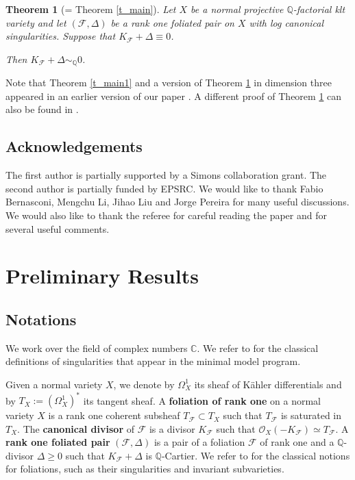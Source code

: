 \documentclass[12pt]{amsart}
\newtheorem{theorem}{Theorem}[section]
\newcommand{\bb}[1]{\mathbb{#1}}
\newcommand{\cal}[1]{\mathcal{#1}}
\begin{document}
\begin{theorem}[= Theorem \ref{t_main}]
\label{t_main0}
Let $X$ be a normal projective $\mathbb Q$-factorial klt variety and let $(\cal F, \Delta)$
be a rank one  foliated pair on $X$ with log canonical singularities.
Suppose that $K_{\cal F}+\Delta \equiv 0$.  

Then $K_{\cal F}+\Delta \sim_{\bb Q} 0$.
\end{theorem}

Note that Theorem \ref{t_main1} and a version of Theorem \ref{t_main0} in dimension three appeared  in an earlier version of our paper \cite{CS20}. 
A different proof of Theorem \ref{t_main0} can also be found  in \cite[Theorem 5.1]{druel2024numericallyflatfoliationsholomorphic}. 

\subsection{Acknowledgements}
The first author is partially supported by a Simons collaboration grant. 
The second author is partially funded by EPSRC. We would like to thank Fabio Bernasconi,  Mengchu Li,  Jihao Liu and Jorge Pereira
for many useful discussions. We would also like to thank the referee for careful reading the paper and for
several useful comments.


\section{Preliminary Results}

\subsection{Notations}
We work over the field of complex numbers $\mathbb C$. 
We refer to \cite{KM98} for the classical definitions of singularities that appear in the minimal model program.

Given a normal variety $X$, we denote by $\Omega^1_X$ its sheaf of K\"ahler differentials and
by $T_X:=(\Omega^1_X)^*$ its tangent sheaf. 
A {\bf foliation of rank one} on a normal variety $X$ is a rank one coherent subsheaf $T_{\cal F}\subset T_X$ such that 
$T_{\cal F}$ is saturated in $T_X$.
The {\bf canonical divisor} of $\cal F$ is a divisor $K_{\cal F}$ such that $\mathcal O_X(-K_{\cal F})\simeq  T_{\mathcal F}$.  
A {\bf rank one foliated  pair} $(\cal F, \Delta)$ is a pair of a foliation $\cal F$ of rank one and a $\bb Q$-divisor $\Delta\ge 0$
such that $K_{\cal F}+\Delta$ is $\bb Q$-Cartier. 
We refer to \cite[Sections 2.1, 2.2 and 2.3]{CS20} for the classical notions for foliations, such as their singularities and invariant subvarieties.
\end{document}
